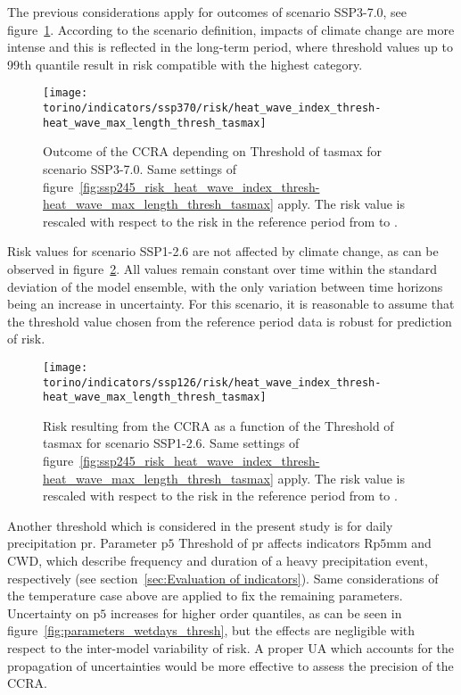 The previous considerations apply for outcomes of scenario SSP3-7.0, see figure~\ref{fig:ssp370_risk_heat_wave_index_thresh-heat_wave_max_length_thresh_tasmax}. According to the scenario definition, impacts of climate change are more intense and this is reflected in the long-term period, where threshold values up to 99th quantile result in risk compatible with the highest category.

\begin{figure}
  \centering
  \texttt{[image: torino/indicators/ssp370/risk/heat\_wave\_index\_thresh-heat\_wave\_max\_length\_thresh\_tasmax]}
  \caption{Outcome of the \gls{CCRA} depending on {Threshold of \gls{tasmax}} for scenario SSP3-7.0. Same settings of figure~\ref{fig:ssp245_risk_heat_wave_index_thresh-heat_wave_max_length_thresh_tasmax} apply. The risk value is rescaled with respect to the risk in the reference period from  to .}
  \label{fig:ssp370_risk_heat_wave_index_thresh-heat_wave_max_length_thresh_tasmax}
\end{figure}

Risk values for scenario SSP1-2.6 are not affected by climate change, as can be observed in figure~\ref{fig:ssp126_risk_heat_wave_index_thresh-heat_wave_max_length_thresh_tasmax}. All values remain constant over time within the standard deviation of the model ensemble, with the only variation between time horizons being an increase in uncertainty. For this scenario, it is reasonable to assume that the threshold value chosen from the reference period data is robust for prediction of risk.

\begin{figure}
  \centering
  \texttt{[image: torino/indicators/ssp126/risk/heat\_wave\_index\_thresh-heat\_wave\_max\_length\_thresh\_tasmax]}
  \caption{Risk resulting from the \gls{CCRA} as a function of the {Threshold of \gls{tasmax}} for scenario SSP1-2.6. Same settings of figure~\ref{fig:ssp245_risk_heat_wave_index_thresh-heat_wave_max_length_thresh_tasmax} apply. The risk value is rescaled with respect to the risk in the reference period from  to .}
  \label{fig:ssp126_risk_heat_wave_index_thresh-heat_wave_max_length_thresh_tasmax}
\end{figure}

Another threshold which is considered in the present study is for daily precipitation \gls{pr}. Parameter $\mathrm{p5}$ {Threshold of \gls{pr}} affects \glspl{indicator} $\mathrm{Rp5mm}$ and $\mathrm{CWD}$, which describe frequency and duration of a heavy precipitation event, respectively (see section~\ref{sec:Evaluation of indicators}). Same considerations of the temperature case above are applied to fix the remaining parameters.
Uncertainty on $\mathrm{p5}$ increases for higher order quantiles, as can be seen in figure~\ref{fig:parameters_wetdays_thresh}, but the effects are negligible with respect to the inter-model variability of risk. A proper \gls{UA} which accounts for the propagation of uncertainties would be more effective to assess the precision of the \gls{CCRA}.

